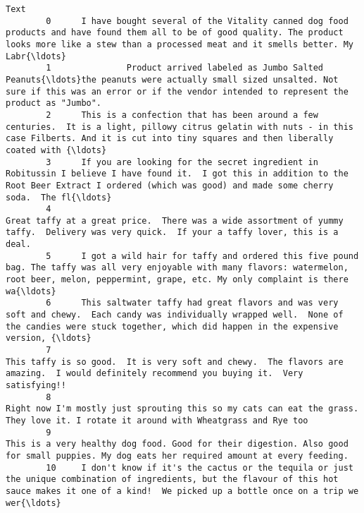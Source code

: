 \documentclass[11pt]{article}
\begin{document}
\begin{Verbatim}[commandchars=\\\{\}]
                                                                                                                                                                                                                  Text  
        0      I have bought several of the Vitality canned dog food products and have found them all to be of good quality. The product looks more like a stew than a processed meat and it smells better. My Labr{\ldots}  
        1               Product arrived labeled as Jumbo Salted Peanuts{\ldots}the peanuts were actually small sized unsalted. Not sure if this was an error or if the vendor intended to represent the product as "Jumbo".  
        2      This is a confection that has been around a few centuries.  It is a light, pillowy citrus gelatin with nuts - in this case Filberts. And it is cut into tiny squares and then liberally coated with {\ldots}  
        3      If you are looking for the secret ingredient in Robitussin I believe I have found it.  I got this in addition to the Root Beer Extract I ordered (which was good) and made some cherry soda.  The fl{\ldots}  
        4                                                                 Great taffy at a great price.  There was a wide assortment of yummy taffy.  Delivery was very quick.  If your a taffy lover, this is a deal.  
        5      I got a wild hair for taffy and ordered this five pound bag. The taffy was all very enjoyable with many flavors: watermelon, root beer, melon, peppermint, grape, etc. My only complaint is there wa{\ldots}  
        6      This saltwater taffy had great flavors and was very soft and chewy.  Each candy was individually wrapped well.  None of the candies were stuck together, which did happen in the expensive version, {\ldots}  
        7                                                                 This taffy is so good.  It is very soft and chewy.  The flavors are amazing.  I would definitely recommend you buying it.  Very satisfying!!  
        8                                                                          Right now I'm mostly just sprouting this so my cats can eat the grass. They love it. I rotate it around with Wheatgrass and Rye too  
        9                                                                    This is a very healthy dog food. Good for their digestion. Also good for small puppies. My dog eats her required amount at every feeding.  
        10     I don't know if it's the cactus or the tequila or just the unique combination of ingredients, but the flavour of this hot sauce makes it one of a kind!  We picked up a bottle once on a trip we wer{\ldots}  

\end{Verbatim}
\end{document}
